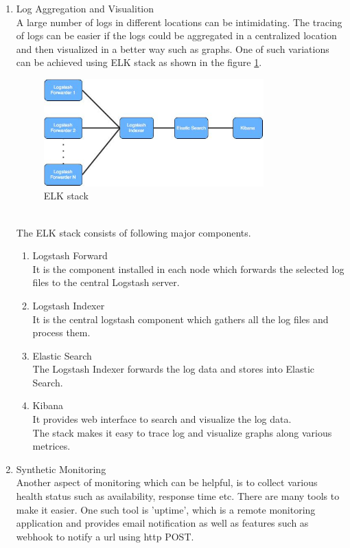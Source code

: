 \begin{enumerate}
\item Log Aggregation and Visualition \\
A large number of logs in different locations can be intimidating. The tracing of logs can be easier if the logs could be aggregated in a centralized location and then visualized in a better way such as graphs. One of such variations can be achieved using ELK stack as shown in the figure \ref{fig:challanges_of_microservices_architecture/elk_stack}. \cite{Anicas:2014aa} \cite{Newman:2015aa}
\begin{figure}[H]
\begin{center}
\includegraphics[width=0.8\textwidth]{figures/challenges_four_elk_stack}
\caption{ELK stack}
\label{fig:challanges_of_microservices_architecture/elk_stack}
\end{center}
\end{figure}
\\
The ELK stack consists of following major components.
\begin{enumerate}
\item Logstash Forward \\ It is the component installed in each node which forwards the selected log files to the central Logstash server.
\item Logstash Indexer \\ It is the central logstash component which gathers all the log files and process them.
\item Elastic Search \\ The Logstash Indexer forwards the log data and stores into Elastic Search.
\item Kibana \\ It provides web interface to search and visualize the log data.\\
The stack makes it easy to trace log and visualize graphs along various metrices.
\end{enumerate}
\item Synthetic Monitoring \\ Another aspect of monitoring which can be helpful, is to collect various health status such as availability, response time etc. There are many tools to make it easier. One such tool is 'uptime', which is a remote monitoring application and provides email notification as well as features such as webhook to notify a url using http POST.

\end{enumerate}
